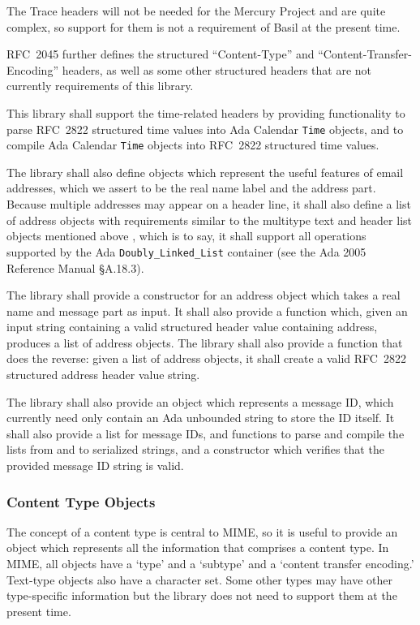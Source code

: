 \documentclass[11pt]{article}
\begin{document}
The Trace headers will not be needed for the Mercury Project and are
quite complex, so support for them is not a requirement of Basil at
the present time.

RFC~2045 further defines the structured ``Content-Type'' and
``Content-Transfer-En\-coding'' headers, as well as some other
structured headers that are not currently requirements of this
library. 

This library shall support the time-related headers by providing
functionality to parse RFC~2822 structured time values into Ada
Calendar \texttt{Time} objects, and to compile Ada Calendar
\texttt{Time} objects into RFC~2822 structured time values.

The library shall also define objects which represent the useful
features of email addresses, which we assert to be the real name label
and the address part. Because multiple addresses may appear on a
header line, it shall also define a list of address objects with
requirements similar to the multitype text and header list objects
mentioned above , which is to say, it shall support
all operations supported by the Ada \texttt{Doubly\_Linked\_List}
container (see the Ada 2005 Reference Manual \S{}A.18.3).

The library shall provide a constructor for an address object which
takes a real name and message part as input. It shall also provide a
function which, given an input string containing a valid structured
header value containing address, produces a list of address objects.
The library shall also provide a function that does the reverse: given
a list of address objects, it shall create a valid RFC~2822 structured
address header value string.

The library shall also provide an object which represents a message
ID, which currently need only contain an Ada unbounded string to store
the ID itself. It shall also provide a list for message IDs, and
functions to parse and compile the lists from and to serialized
strings, and a constructor which verifies that the provided message
ID string is valid.

\subsubsection{Content Type Objects}
\label{pi:content-types}

The concept of a content type is central to MIME, so it is useful to
provide an object which represents all the information that comprises
a content type. In MIME, all objects have a `type' and a `subtype' and
a `content transfer encoding.' Text-type objects also have a character
set. Some other types may have other type-specific information but the
library does not need to support them at the present time.
\end{document}
